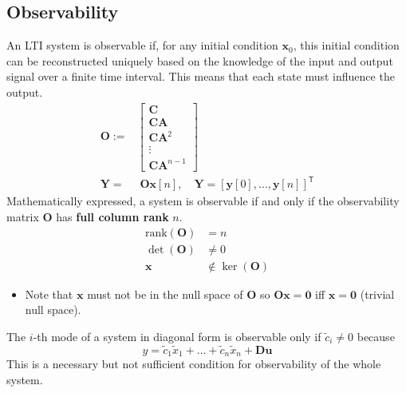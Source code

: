 \subsection{Observability}

An LTI system is observable if, for any initial condition $\mathbf{x}_0$, this initial condition can be reconstructed uniquely based on the knowledge of the input and output signal over a finite time interval. This means that each state must influence the output.
\noindent\begin{align*}
    \mathbf{O} := & \begin{bmatrix}
                        \mathbf{C}    \\
                        \mathbf{CA}   \\
                        \mathbf{CA}^2 \\
                        \vdots        \\
                        \mathbf{CA}^{n-1}
                    \end{bmatrix}                                                                                   \\
    \mathbf{Y} =  & \; \mathbf{Ox}[n],\quad \mathbf{Y}={\left[\mathbf{y}[0],\ldots, \mathbf{y}[n]\right]}^{\mathsf{T}}
\end{align*}
Mathematically expressed, a system is observable if and only if the observability matrix $\mathbf{O}$ has \textbf{full column rank} $n$.
\begin{align*}
    \text{rank}(\mathbf{O}) & = n                     \\
    \det(\mathbf{O})        & \neq 0                  \\
    \mathbf{x}              & \notin \ker(\mathbf{O})
\end{align*}

\newpar{}
\begin{itemize}
    \item Note that $\mathbf{x}$ must not be in the null space of $\mathbf{O}$ so $\mathbf{Ox}=\mathbf{0}$ iff $\mathbf{x}=\mathbf{0}$ (trivial null space). %
\end{itemize}


The $i$-th mode of a system in diagonal form is observable only if $\tilde{c}_i \neq 0$ because
\begin{equation*}
    y=\tilde{c}_1\tilde{x}_1+\ldots+\tilde{c}_n\tilde{x}_n+\mathbf{Du} %
\end{equation*}
This is a necessary but not sufficient condition for observability of the whole system.

